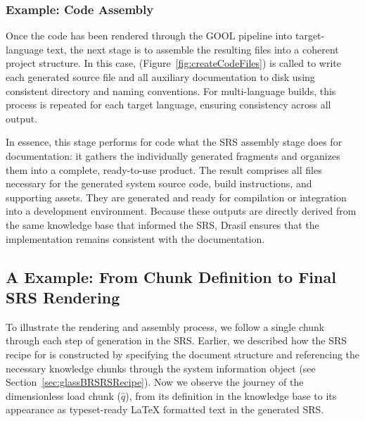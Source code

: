 

\subsubsection{Example: Code Assembly}

Once the code has been rendered through the GOOL pipeline into target-language 
text, the next stage is to assemble the resulting files into a coherent project 
structure. In this case,  
(Figure~\ref{fig:createCodeFiles}) is called to write each generated source 
file and all auxiliary documentation to disk using consistent directory and 
naming conventions. For multi-language builds, this process is repeated for 
each target language, ensuring consistency across all output.

In essence, this stage performs for code what the SRS assembly stage does for 
documentation: it gathers the individually generated fragments and organizes 
them into a complete, ready-to-use product. The result comprises all files 
necessary for the generated system source code, build instructions, and 
supporting assets. They are generated and ready for compilation or integration 
into a development environment. Because these outputs are directly derived from 
the same knowledge base that informed the SRS, Drasil ensures that the 
implementation remains consistent with the documentation.


\subsection{A \gb{} Example: From Chunk Definition to Final SRS Rendering}

To illustrate the rendering and assembly process, we follow a single chunk 
through each step of generation in the \gb{} SRS. Earlier, we 
described how the SRS recipe for \gb{} is constructed by specifying the 
document structure and referencing the necessary knowledge chunks through the 
system information object (see Section~\ref{sec:glassBRSRSRecipe}). Now we 
observe the journey of the dimensionless load chunk ($\hat{q}$), from 
its definition in the knowledge base to its appearance as typeset-ready \LaTeX 
formatted text in the generated SRS.

